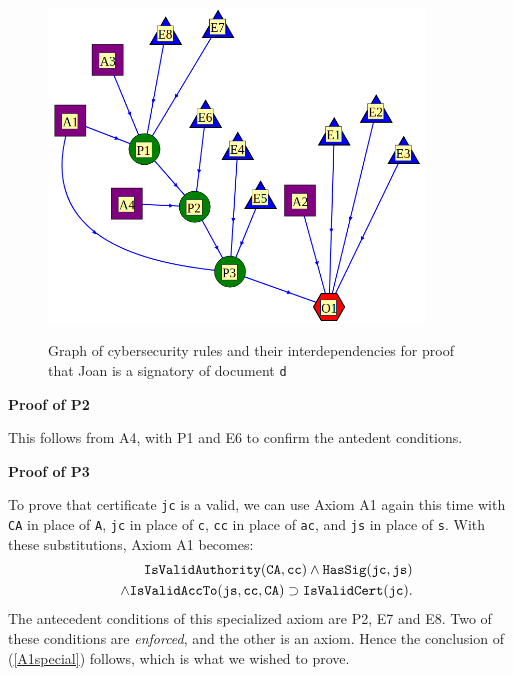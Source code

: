 \begin{figure}[bhpt]
	\begin{centering}
		\leavevmode\includegraphics[width=10cm]{figures/rigorous_certificate.png}\ \\
			\caption{Graph of cybersecurity rules and their interdependencies for 
			proof that Joan is a signatory of document {\tt d}}\label{certificaterulesgraph}
	\end{centering}
		\vspace{-5mm}
\end{figure}

{\bf Proof of P2}

This follows from A4, with P1 and E6 to confirm the antedent conditions.

{\bf Proof of P3}

To prove that  certificate {\tt jc} is a valid, we can use Axiom A1 again
this time with {\tt CA} in place of {\tt A}, {\tt jc} in place of {\tt c}, 
{\tt cc} in place of {\tt ac}, 
and {\tt js} in place of {\tt s}.
With these substitutions,
Axiom A1 becomes:
\begin{eqnarray}\label{A2specific2} \nonumber
&&	\hbox{\tt IsValidAuthority}({\tt CA},{\tt cc}) \wedge \hbox{\tt HasSig}({\tt jc},{\tt js})\\ \nonumber
&&\wedge \hbox{\tt IsValidAccTo}({\tt js}, {\tt cc}, {\tt CA} ) 
\supset \hbox{\tt IsValidCert}({\tt jc}).
\end{eqnarray}
The antecedent conditions of this specialized axiom are
P2, E7 and E8. Two of these conditions are {\em enforced}, and the other is
an axiom. Hence the conclusion of (\ref{A1special}) follows, which
is what we wished to prove.

